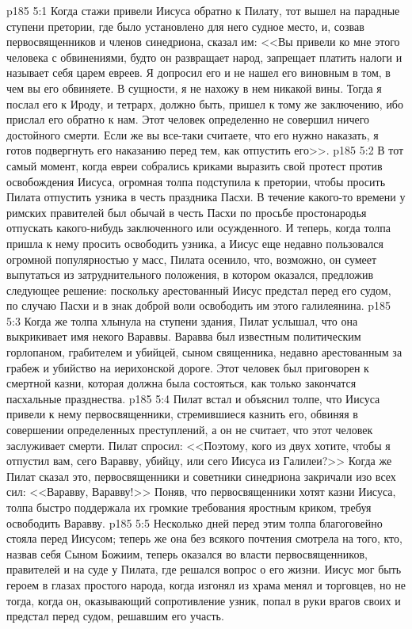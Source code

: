 \vs p185 5:1 Когда стажи привели Иисуса обратно к Пилату, тот вышел на парадные ступени претории, где было установлено для него судное место, и, созвав первосвященников и членов синедриона, сказал им: <<Вы привели ко мне этого человека с обвинениями, будто он развращает народ, запрещает платить налоги и называет себя царем евреев. Я допросил его и не нашел его виновным в том, в чем вы его обвиняете. В сущности, я не нахожу в нем никакой вины. Тогда я послал его к Ироду, и тетрарх, должно быть, пришел к тому же заключению, ибо прислал его обратно к нам. Этот человек определенно не совершил ничего достойного смерти. Если же вы все\hyp{}таки считаете, что его нужно наказать, я готов подвергнуть его наказанию перед тем, как отпустить его>>.
\vs p185 5:2 В тот самый момент, когда евреи собрались криками выразить свой протест против освобождения Иисуса, огромная толпа подступила к претории, чтобы просить Пилата отпустить узника в честь праздника Пасхи. В течение какого\hyp{}то времени у римских правителей был обычай в честь Пасхи по просьбе простонародья отпускать какого\hyp{}нибудь заключенного или осужденного. И теперь, когда толпа пришла к нему просить освободить узника, а Иисус еще недавно пользовался огромной популярностью у масс, Пилата осенило, что, возможно, он сумеет выпутаться из затруднительного положения, в котором оказался, предложив следующее решение: поскольку арестованный Иисус предстал перед его судом, по случаю Пасхи и в знак доброй воли освободить им этого галилеянина.
\vs p185 5:3 Когда же толпа хлынула на ступени здания, Пилат услышал, что она выкрикивает имя некого Вараввы. Варавва был известным политическим горлопаном, грабителем и убийцей, сыном священника, недавно арестованным за грабеж и убийство на иерихонской дороге. Этот человек был приговорен к смертной казни, которая должна была состояться, как только закончатся пасхальные празднества.
\vs p185 5:4 Пилат встал и объяснил толпе, что Иисуса привели к нему первосвященники, стремившиеся казнить его, обвиняя в совершении определенных преступлений, а он не считает, что этот человек заслуживает смерти. Пилат спросил: <<Поэтому, кого из двух хотите, чтобы я отпустил вам, сего Варавву, убийцу, или сего Иисуса из Галилеи?>> Когда же Пилат сказал это, первосвященники и советники синедриона закричали изо всех сил: <<Варавву, Варавву!>> Поняв, что первосвященники хотят казни Иисуса, толпа быстро поддержала их громкие требования яростным криком, требуя освободить Варавву.
\vs p185 5:5 Несколько дней перед этим толпа благоговейно стояла перед Иисусом; теперь же она без всякого почтения смотрела на того, кто, назвав себя Сыном Божиим, теперь оказался во власти первосвященников, правителей и на суде у Пилата, где решался вопрос о его жизни. Иисус мог быть героем в глазах простого народа, когда изгонял из храма менял и торговцев, но не тогда, когда он, оказывающий сопротивление узник, попал в руки врагов своих и предстал перед судом, решавшим его участь.

